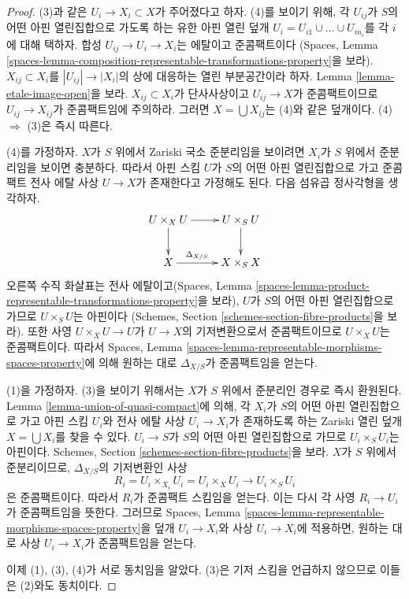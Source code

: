 \begin{proof}
(3)과 같은 $U_i \to X_i \subset X$가 주어졌다고 하자. (4)를 보이기 위해,
각 $U_{ij}$가 $S$의 어떤 아핀 열린집합으로 가도록 하는 유한 아핀 열린 덮개
$U_i = U_{i1} \cup \ldots \cup U_{in_i}$를 각 $i$에 대해 택하자.
합성 $U_{ij} \to U_i \to X_i$는 에탈이고 준콤팩트이다
(Spaces, Lemma
\ref{spaces-lemma-composition-representable-transformations-property}을 보라).
$X_{ij} \subset X_i$를 $|U_{ij}| \to |X_i|$의 상에 대응하는
열린 부분공간이라 하자. Lemma \ref{lemma-etale-image-open}을 보라.
$X_{ij} \subset X_i$가 단사사상이고 $U_{ij} \to X$가 준콤팩트이므로
$U_{ij} \to X_{ij}$가 준콤팩트임에 주의하라.
그러면 $X = \bigcup X_{ij}$는 (4)와 같은 덮개이다.
(4) $\Rightarrow$ (3)은 즉시 따른다.

\medskip\noindent
(4)를 가정하자. $X$가 $S$ 위에서 Zariski 국소 준분리임을 보이려면
$X_i$가 $S$ 위에서 준분리임을 보이면 충분하다.
따라서 아핀 스킴 $U$가 $S$의 어떤 아핀 열린집합으로 가고
준콤팩트 전사 에탈 사상 $U \to X$가 존재한다고 가정해도 된다.
다음 섬유곱 정사각형을 생각하자.
$$
\xymatrix{
U \times_X U \ar[r] \ar[d] & U \times_S U \ar[d] \\
X \ar[r]^-{\Delta_{X/S}} & X \times_S X
}
$$
오른쪽 수직 화살표는 전사 에탈이고(Spaces, Lemma
\ref{spaces-lemma-product-representable-transformations-property}을 보라),
$U$가 $S$의 어떤 아핀 열린집합으로 가므로 $U \times_S U$는 아핀이다
(Schemes, Section \ref{schemes-section-fibre-products}을 보라).
또한 사영 $U \times_X U \to U$가 $U \to X$의 기저변환으로서
준콤팩트이므로 $U \times_X U$는 준콤팩트이다.
따라서 Spaces, Lemma
\ref{spaces-lemma-representable-morphisms-spaces-property}에 의해
원하는 대로 $\Delta_{X/S}$가 준콤팩트임을 얻는다.

\medskip\noindent
(1)을 가정하자. (3)을 보이기 위해서는 $X$가 $S$ 위에서 준분리인 경우로
즉시 환원된다. Lemma \ref{lemma-union-of-quasi-compact}에 의해,
각 $X_i$가 $S$의 어떤 아핀 열린집합으로 가고 아핀 스킴 $U_i$와
전사 에탈 사상 $U_i \to X_i$가 존재하도록 하는 Zariski 열린 덮개
$X = \bigcup X_i$를 찾을 수 있다.
$U_i \to S$가 $S$의 어떤 아핀 열린집합으로 가므로
$U_i \times_S U_i$는 아핀이다. Schemes, Section
\ref{schemes-section-fibre-products}을 보라.
$X$가 $S$ 위에서 준분리이므로, $\Delta_{X/S}$의 기저변환인 사상
$$
R_i = U_i \times_{X_i} U_i = U_i \times_X U_i
\longrightarrow
U_i \times_S U_i
$$
은 준콤팩트이다. 따라서 $R_i$가 준콤팩트 스킴임을 얻는다.
이는 다시 각 사영 $R_i \to U_i$가 준콤팩트임을 뜻한다. 그러므로
Spaces, Lemma \ref{spaces-lemma-representable-morphisms-spaces-property}을
덮개 $U_i \to X_i$와 사상 $U_i \to X_i$에 적용하면,
원하는 대로 사상 $U_i \to X_i$가 준콤팩트임을 얻는다.

\medskip\noindent
이제 (1), (3), (4)가 서로 동치임을 알았다. (3)은 기저 스킴을
언급하지 않으므로 이들은 (2)와도 동치이다.
\end{proof}

